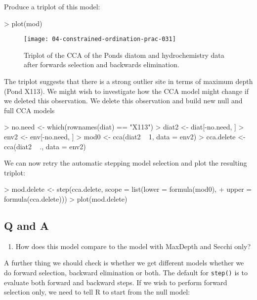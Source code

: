 \documentclass[a4paper,10pt]{article}
\newcommand{\R}{\textsf{R}\xspace}
\begin{document}
Produce a triplot of this model:

\begin{Schunk}
\begin{Sinput}
> plot(mod)
\end{Sinput}
\end{Schunk}

\begin{figure}[t]
\begin{center}
\texttt{[image: 04-constrained-ordination-prac-031]}
\caption{\label{final_triplot}Triplot of the CCA of the Ponds diatom and hydrochemistry data after forwards selection and backwards elimination.}
\end{center}
\end{figure}

The triplot suggests that there is a strong outlier site in terms of maximum depth (Pond X113). We might wish to investigate how the CCA model might change if we deleted this observation. We delete this observation and build new null and full CCA models

\begin{Schunk}
\begin{Sinput}
> no.need <- which(rownames(diat) == "X113")
> diat2 <- diat[-no.need, ]
> env2 <- env[-no.need, ]
> mod0 <- cca(diat2 ~ 1, data = env2)
> cca.delete <- cca(diat2 ~ ., data = env2)
\end{Sinput}
\end{Schunk}

We can now retry the automatic stepping model selection and plot the resulting triplot:

\begin{Schunk}
\begin{Sinput}
> mod.delete <- step(cca.delete, scope = list(lower = formula(mod0),
+                    upper = formula(cca.delete)))
> plot(mod.delete)
\end{Sinput}
\end{Schunk}

\subsection*{Q and A}
\begin{enumerate}
\item How does this model compare to the model with MaxDepth and Secchi only?
\end{enumerate}

A further thing we should check is whether we get different models whether we do forward selection, backward elimination or both. The default for \texttt{step()} is to evaluate both forward and backward steps. If we wish to perform forward selection only, we need to tell \R to start from the null model:
\end{document}
